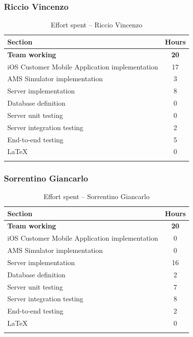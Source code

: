 \documentclass[a4paper,oneside,11pt]{book}
\begin{document}
    \subsubsection{Riccio Vincenzo}
    \begin{longtable}[c]{|H{.55\textwidth}|c|}
        \hline
        \textbf{Section} & {\bfseries{Hours}} \\ \hline
        \textbf{Team working} & \textbf{20} \\ \hline
        iOS Customer Mobile Application implementation                                  & 17 \\ \hline
        AMS Simulator implementation   & 3 \\ \hline
        Server implementation                          & 8 \\ \hline
        Database definition                         & 0 \\ \hline
        Server unit testing                         & 0 \\ \hline
        Server integration testing                           & 2 \\ \hline
        End-to-end testing                      & 5 \\ \hline
        \LaTeX                                 & 0 \\ \hline
        \caption{Effort spent -- Riccio Vincenzo}
        \label{table:effort_riccio}
    \end{longtable}
    
    \newpage
    \subsubsection{Sorrentino Giancarlo}
    \begin{longtable}[c]{|H{.55\textwidth}|c|}
        \hline
        \textbf{Section} & {\bfseries{Hours}} \\ \hline
        \textbf{Team working} & \textbf{20} \\ \hline
        iOS Customer Mobile Application implementation                                  & 0 \\ \hline
        AMS Simulator implementation   & 0 \\ \hline
        Server implementation                          & 16 \\ \hline
        Database definition                         & 2 \\ \hline
        Server unit testing                         & 7 \\ \hline
        Server integration testing                           & 8 \\ \hline
        End-to-end testing                      & 2 \\ \hline
        \LaTeX                                 & 0 \\ \hline
        \caption{Effort spent -- Sorrentino Giancarlo}
        \label{table:effort_sorrentino}
    \end{longtable}
    
\end{document}
